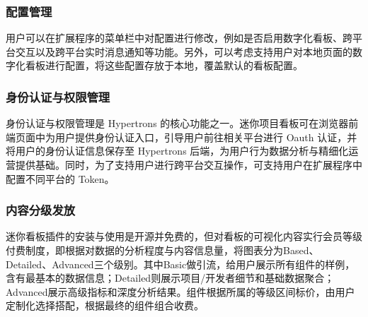 \subsubsection{配置管理}
\par 用户可以在扩展程序的菜单栏中对配置进行修改，例如是否启用数字化看板、跨平台交互以及跨平台实时消息通知等功能。另外，可以考虑支持用户对本地页面的数字化看板进行配置，将这些配置存放于本地，覆盖默认的看板配置。

\subsubsection{身份认证与权限管理}
\par 身份认证与权限管理是 Hypertrons 的核心功能之一。迷你项目看板可在浏览器前端页面中为用户提供身份认证入口，引导用户前往相关平台进行 Oauth 认证，并将用户的身份认证信息保存至 Hypertrons 后端，为用户行为数据分析与精细化运营提供基础。同时，为了支持用户进行跨平台交互操作，可支持用户在扩展程序中配置不同平台的 Token。

\subsubsection{内容分级发放}
\par 迷你看板插件的安装与使用是开源并免费的，但对看板的可视化内容实行会员等级付费制度，即根据对数据的分析程度与内容信息量，将图表分为Based、Detailed、Advanced三个级别。其中Basic做引流，给用户展示所有组件的样例，含有最基本的数据信息；Detailed则展示项目/开发者细节和基础数据聚合；Advanced展示高级指标和深度分析结果。组件根据所属的等级区间标价，由用户定制化选择搭配，根据最终的组件组合收费。
